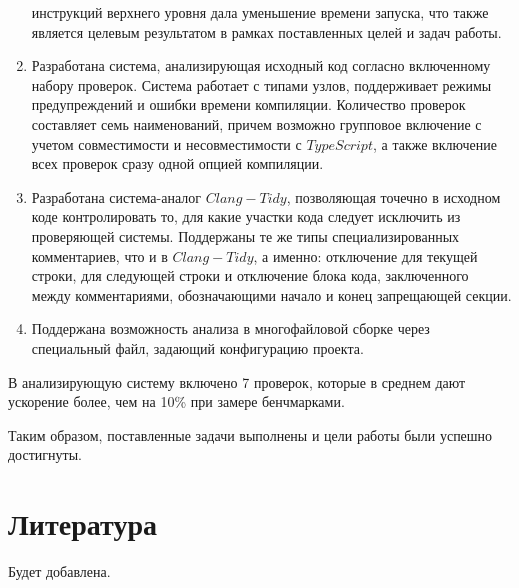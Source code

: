 \documentclass{mipt-thesis-bs}
\begin{document}
\begin{enumerate}
    инструкций верхнего уровня дала уменьшение времени запуска, что также является целевым результатом в рамках 
    поставленных целей и задач работы.
    \item Разработана система, анализирующая исходный код согласно включенному набору проверок. Система работает 
    с типами узлов, поддерживает режимы предупреждений и ошибки времени компиляции. Количество проверок составляет 
    семь наименований, причем возможно групповое включение с учетом совместимости и несовместимости с 
    $TypeScript$, а также включение всех проверок сразу одной опцией компиляции.
    \item Разработана система-аналог $Clang-Tidy$, позволяющая точечно в исходном коде контролировать 
    то, для какие участки кода следует исключить из проверяющей системы. Поддержаны те же типы специализированных 
    комментариев, что и в $Clang-Tidy$, а именно: отключение для текущей строки, для следующей строки и отключение 
    блока кода, заключенного между комментариями, обозначающими начало и конец запрещающей секции.
    \item Поддержана возможность анализа в многофайловой сборке через специальный файл, задающий 
    конфигурацию проекта.
\end{enumerate}

В анализирующую систему включено 7 проверок, которые в среднем дают ускорение более, чем на 10\% 
при замере бенчмарками.

Таким образом, поставленные задачи выполнены и цели работы были успешно 
достигнуты.

\backmatter


\chapter{Литература}

Будет добавлена.
\end{document}
